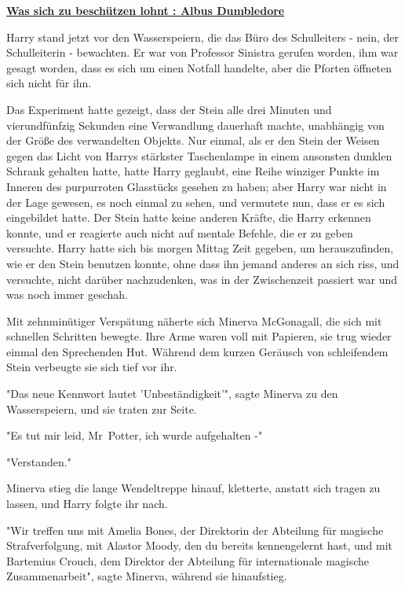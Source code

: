 

\hypertarget{was-sich-zu-beschuxfctzen-lohnt-albus-dumbledore}{%

\textbf{\uline{Was sich zu beschützen lohnt : Albus Dumbledore}}

Harry stand jetzt vor den Wasserspeiern, die das Büro des Schulleiters - nein, der Schulleiterin - bewachten. Er war von Professor Sinistra gerufen worden, ihm war gesagt worden, dass es sich um einen Notfall handelte, aber die Pforten öffneten sich nicht für ihn.

Das Experiment hatte gezeigt, dass der Stein alle drei Minuten und vierundfünfzig Sekunden eine Verwandlung dauerhaft machte, unabhängig von der Größe des verwandelten Objekts. Nur einmal, als er den Stein der Weisen gegen das Licht von Harrys stärkster Taschenlampe in einem ansonsten dunklen Schrank gehalten hatte, hatte Harry geglaubt, eine Reihe winziger Punkte im Inneren des purpurroten Glasstücks gesehen zu haben; aber Harry war nicht in der Lage gewesen, es noch einmal zu sehen, und vermutete nun, dass er es sich eingebildet hatte. Der Stein hatte keine anderen Kräfte, die Harry erkennen konnte, und er reagierte auch nicht auf mentale Befehle, die er zu geben versuchte. Harry hatte sich bis morgen Mittag Zeit gegeben, um herauszufinden, wie er den Stein benutzen konnte, ohne dass ihn jemand anderes an sich riss, und versuchte, nicht darüber nachzudenken, was in der Zwischenzeit passiert war und was noch immer geschah.

Mit zehnminütiger Verspätung näherte sich Minerva McGonagall, die sich mit schnellen Schritten bewegte. Ihre Arme waren voll mit Papieren, sie trug wieder einmal den Sprechenden Hut. Während dem kurzen Geräusch von schleifendem Stein verbeugte sie sich tief vor ihr.

"Das neue Kennwort lautet 'Unbeständigkeit'", sagte Minerva zu den Wasserspeiern, und sie traten zur Seite.

"Es tut mir leid, Mr~Potter, ich wurde aufgehalten -"

"Verstanden."

Minerva stieg die lange Wendeltreppe hinauf, kletterte, anstatt sich tragen zu lassen, und Harry folgte ihr nach.

"Wir treffen uns mit Amelia Bones, der Direktorin der Abteilung für magische Strafverfolgung, mit Alastor Moody, den du bereits kennengelernt hast, und mit Bartemius Crouch, dem Direktor der Abteilung für internationale magische Zusammenarbeit", sagte Minerva, während sie hinaufstieg.

}
